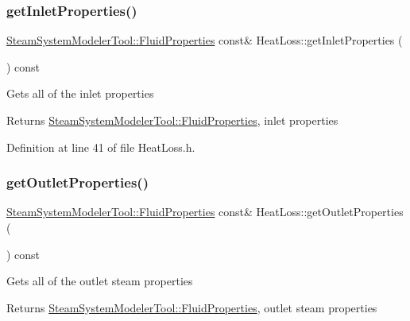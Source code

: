 \mbox{\label{class_heat_loss_a7bea461460dbacf1855d5375bbf6c097}} 
\subsubsection{\texorpdfstring{get\+Inlet\+Properties()}{getInletProperties()}\hspace{0.1cm}{\footnotesize\ttfamily [3/3]}}
{\footnotesize\ttfamily \hyperlink{struct_steam_system_modeler_tool_1_1_fluid_properties}{Steam\+System\+Modeler\+Tool\+::\+Fluid\+Properties} const\& Heat\+Loss\+::get\+Inlet\+Properties (\begin{DoxyParamCaption}{ }\end{DoxyParamCaption}) const\hspace{0.3cm}{\ttfamily [inline]}}

Gets all of the inlet properties \begin{DoxyReturn}{Returns}
\hyperlink{struct_steam_system_modeler_tool_1_1_fluid_properties}{Steam\+System\+Modeler\+Tool\+::\+Fluid\+Properties}, inlet properties 
\end{DoxyReturn}


Definition at line 41 of file Heat\+Loss.\+h.

\mbox{\label{class_heat_loss_a3e483dda6f393d67d7a0f28bcd75e545}} 
\subsubsection{\texorpdfstring{get\+Outlet\+Properties()}{getOutletProperties()}\hspace{0.1cm}{\footnotesize\ttfamily [1/3]}}
{\footnotesize\ttfamily \hyperlink{struct_steam_system_modeler_tool_1_1_fluid_properties}{Steam\+System\+Modeler\+Tool\+::\+Fluid\+Properties} const\& Heat\+Loss\+::get\+Outlet\+Properties (\begin{DoxyParamCaption}{ }\end{DoxyParamCaption}) const\hspace{0.3cm}{\ttfamily [inline]}}

Gets all of the outlet steam properties \begin{DoxyReturn}{Returns}
\hyperlink{struct_steam_system_modeler_tool_1_1_fluid_properties}{Steam\+System\+Modeler\+Tool\+::\+Fluid\+Properties}, outlet steam properties 
\end{DoxyReturn}


